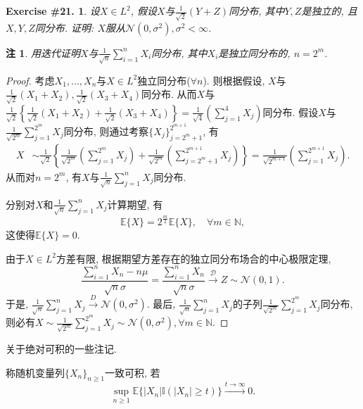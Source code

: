 \documentclass[UTF8, a4paper]{article}
\newtheorem{exercise}{Exercise \#21.}
\newtheorem*{remark}{注}
\begin{document}
\begin{framed}
\begin{exercise}
设\(X\in L^2\), 假设\(X\)与\(\frac{1}{\sqrt{2}}(Y+Z)\)同分布, 其中\(Y,Z\)是独立的, 且\(X,Y,Z\)同分布.
证明: \(X\)服从\(\mathcal{N}(0, \sigma^2), \sigma^2 < \infty\).
\end{exercise}
\end{framed}
\begin{remark}
用迭代证明\(X\)与\(\frac{1}{\sqrt{n}} \sum_{i=1}^{n}X_i\)同分布, 其中\(X_i\)是独立同分布的, \(n = 2^m\).
\end{remark}

\begin{proof}
考虑\(X_1, ..., X_n\)与\(X \in L^2\)独立同分布(\(\forall n\)).
则根据假设, \(X\)与\(\frac{1}{\sqrt{2}}(X_1 + X_2), \frac{1}{\sqrt{2}}(X_3 + X_4)\)同分布. 
从而\(X\)与\(\frac{1}{\sqrt{2}}\left\{\frac{1}{\sqrt{2}}(X_1 + X_2) + \frac{1}{\sqrt{2}}(X_3 + X_4)\right\} = \frac{1}{\sqrt{4}}\left(\sum_{j = 1}^{4}X_j\right)\)同分布.
假设\(X\)与\(\frac{1}{\sqrt{2^m}}\sum_{j=1}^{2^m}X_j\)同分布, 则通过考察\(\{X_j\}_{j = 2^m + 1}^{2^{m+1}}\), 有
\begin{align*}
    X &\sim \frac{1}{\sqrt{2}}\left\{\frac{1}{\sqrt{2^m}}\left(\sum_{j=1}^{2^m}X_j\right) + \frac{1}{\sqrt{2^m}}\left(\sum_{j=2^m + 1}^{2^{m + 1}}X_j\right)\right\} = \frac{1}{\sqrt{2^{m+1}}}\left(\sum_{j=1}^{2^{m+1}}X_j\right).
\end{align*}
从而对\(n = 2^m\), 有\(X\)与\(\frac{1}{\sqrt{n}}\sum_{j=1}^{n}X_j\)同分布.

分别对\(X\)和\(\frac{1}{\sqrt{n}}\sum_{j=1}^{n}X_j\)计算期望, 有
$$
\mathbb{E}\{X\} = 2^{\frac{m}{2}} \mathbb{E}\{X\}, \quad \forall m \in \mathbb{N},
$$
这使得\(\mathbb{E}\{X\} = 0\).

由于\(X \in L^2\)方差有限, 根据期望方差存在的独立同分布场合的中心极限定理, 
$$
\frac{\sum_{i=1}^{n}X_n - n\mu}{\sqrt{n}\sigma} = \frac{\sum_{i=1}^{n}X_n }{\sqrt{n}\sigma} \xrightarrow{\mathcal{D}} Z \sim \mathcal{N}(0, 1).
$$
于是, \(\frac{1}{\sqrt{n}}\sum_{j=1}^{n}X_j \xrightarrow{D} \mathcal{N}(0, \sigma^2)\).
最后, \(\frac{1}{\sqrt{n}}\sum_{j=1}^{n}X_j\)的子列\(\frac{1}{\sqrt{2^m}}\sum_{j=1}^{2^m}X_j\)同分布, 则必有\(X \sim \frac{1}{\sqrt{2^m}}\sum_{j=1}^{2^m}X_j \sim \mathcal{N}(0, \sigma^2), \forall m\in\mathbb{N}\).
\end{proof}


\begin{framed}
关于绝对可积的一些注记.

称随机变量列\(\{X_n\}_{n\geq 1}\)一致可积, 若 
$$
\sup_{n\geq 1} \mathbb{E}\{|X_n| \mathbb{I}(|X_n| \geq t)\} \xrightarrow{t\to\infty} 0.
$$
\end{framed}
\end{document}
